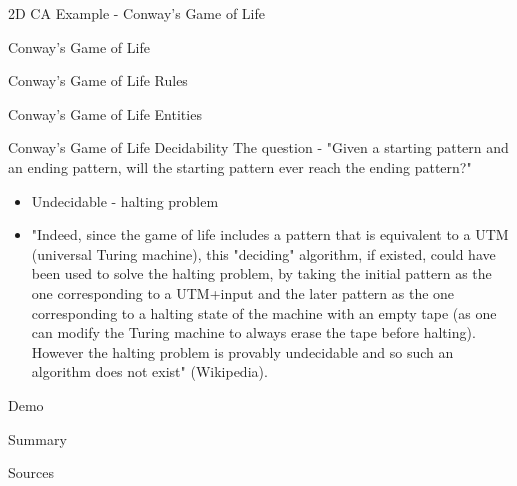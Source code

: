 \documentclass[bigger]{beamer}
\begin{document}
\begin{frame}[label=sec-13]{2D CA Example - Conway's Game of Life}
\end{frame}
\begin{frame}[label=sec-14]{Conway's Game of Life}
\end{frame}
\begin{frame}[label=sec-15]{Conway's Game of Life Rules}
\end{frame}
\begin{frame}[label=sec-16]{Conway's Game of Life Entities}
\end{frame}
\begin{frame}[label=sec-17]{Conway's Game of Life Decidability}
The question - "Given a starting pattern and an ending pattern, will the starting pattern ever reach the ending pattern?"
\begin{itemize}
\item<2->Undecidable - halting problem
\item<3->"Indeed, since the game of life includes a pattern that is equivalent to a UTM (universal Turing machine), this "deciding" algorithm, if existed, could have been used to solve the halting problem, by taking the initial pattern as the one corresponding to a UTM+input and the later pattern as the one corresponding to a halting state of the machine with an empty tape (as one can modify the Turing machine to always erase the tape before halting). However the halting problem is provably undecidable and so such an algorithm does not exist" (Wikipedia).
\end{itemize}
\end{frame}
\begin{frame}[label=sec-18]{Demo}
\end{frame}
\begin{frame}[label=sec-19]{Summary}
\end{frame}
\begin{frame}[label=sec-20]{Sources}
\end{frame}
\end{document}
